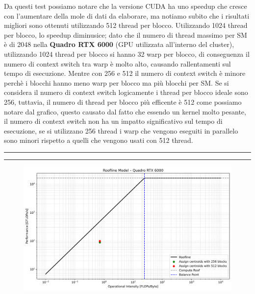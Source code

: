 \documentclass{article}
\begin{document}
  Da questi test possiamo notare che la versione CUDA ha uno speedup che cresce con l'aumentare della mole di dati da elaborare, ma notiamo subito che
  i risultati migliori sono ottenuti utilizzando 512 thread per blocco. Utilizzando 1024 thread per blocco, lo speedup diminusice; dato che 
  il numero di thread massimo per SM è di 2048 nella \textbf{Quadro RTX 6000} (GPU utilizzata all'interno del cluster), utilizzando 1024 thread per blocco si hanno 32 warp per blocco, di conseguenza il numero di context switch tra warp è molto alto, causando 
  rallentamenti sul tempo di esecuzione. Mentre con 256 e 512 il numero di context switch è minore perchè i blocchi hanno meno warp per blocco ma più blocchi per SM. Se si considera 
  il numero di context switch logicamente i thread per blocco ideale sono 256, tuttavia, il numero di thread per blocco più efficente è 512 come possiamo notare dal grafico,
  questo causato dal fatto che essendo un kernel molto pesante, il numero di context switch non ha un impatto significativo sul tempo di esecuzione, se si utilizzano 256 thread 
  i warp che vengono eseguiti in parallelo sono minori rispetto a quelli che vengono usati con 512 thread.

  \begin{center}
    \rule{2.5cm}{1pt}  \rule{2.5cm}{1pt}
  \end{center}
 
  \begin{figure}[ht]
    \hspace*{-1.1cm}  %
    \centering
    \begin{minipage}{0.50\textwidth}
      \includegraphics[width=\linewidth]{../test_csv/plots/roofline_cuda.png}
    \end{minipage}
  \end{figure}
\end{document}
